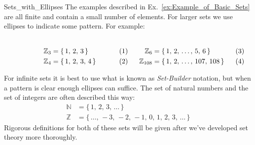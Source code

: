     \begin{lexample}{}{Sets_with_Ellipses}
        The examples described in Ex.~\ref{ex:Example_of_Basic_Sets} are all
        finite and contain a small number of elements. For larger sets we use
        ellipses to indicate some pattern. For example:
        \par
        \begin{subequations}
            \begin{minipage}[b]{0.49\textwidth}
                \centering
                \begin{align}
                    \mathbb{Z}_{3}&=\{\,1,\,2,\,3\,\}\\
                    \mathbb{Z}_{4}&=\{\,1,\,2,\,3,\,4\,\}
                \end{align}
            \end{minipage}
            \hfill
            \begin{minipage}[b]{0.49\textwidth}
                \centering
                \begin{align}
                    \mathbb{Z}_{6}  &=\{\,1,\,2,\,\dots,\,5,\,6\,\}\\
                    \mathbb{Z}_{108}&=\{\,1,\,2,\,\dots,\,107,\,108\,\}
                \end{align}
            \end{minipage}
        \end{subequations}
        \par\vspace{2.5ex}
        For infinite sets it is best to use what is known as
        \textit{Set-Builder} notation, but when a pattern is clear enough
        ellipses can suffice. The set of natural numbers and the set of
        integers are often described this way:
        \begin{subequations}
            \begin{align}
                \label{eqn:Natural_Numbers_Ellipses}%
                \mathbb{N}&=\{\,1,\,2,\,3,\,\dots\,\}\\
                \label{eqn:Integers_Ellipses}%
                \mathbb{Z}&=\{\,\dots,\,\minus{3},\,\minus{2},\,\minus{1},\,
                                0,\,1,\,2,\,3,\,\dots\,\}
            \end{align}
        \end{subequations}
        Rigorous definitions for both of these sets will be given after we've
        developed set theory more thoroughly.
    \end{lexample}
